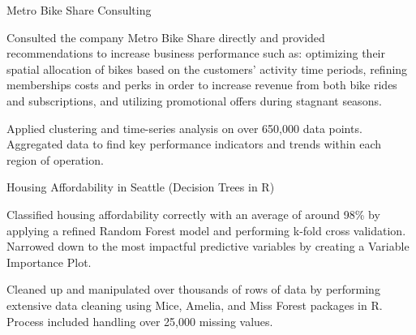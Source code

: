 

\begin{cvsubentries}

  \cvsubentry
    {Metro Bike Share Consulting} %
    {
      \begin{cvitems} %
        \item {Consulted the company Metro Bike Share directly and provided recommendations to increase business performance such as: optimizing their spatial allocation of bikes based on the customers’ activity time periods, refining memberships costs and perks in order to increase revenue from both bike rides and subscriptions, and utilizing promotional offers during stagnant seasons.}
        \item {Applied clustering and time-series analysis on over 650,000 data points. Aggregated data to find key performance indicators and trends within each region of operation.}
      \end{cvitems} }

  \cvsubentry
    {Housing Affordability in Seattle (Decision Trees in R)} %
    {
      \begin{cvitems} %
        \item {Classified housing affordability correctly with an average of around 98\% by applying a refined Random Forest model and performing k-fold cross validation. Narrowed down to the most impactful predictive variables by creating a Variable Importance Plot.}
        \item {Cleaned up and manipulated over thousands of rows of data by performing extensive data cleaning using Mice, Amelia, and Miss Forest packages in R. Process included handling over 25,000 missing values.}
      \end{cvitems}	}

\end{cvsubentries}
